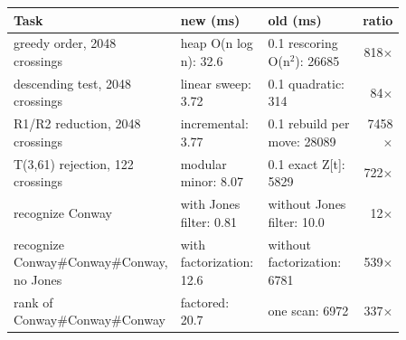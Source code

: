 \begin{tabular}{@{}p{0.36\linewidth}p{0.23\linewidth}p{0.27\linewidth}r@{}}
\toprule
Task & new (ms) & old (ms) & ratio \\
\midrule
greedy order, 2048 crossings & heap O(n log n): 32.6 & 0.1 rescoring O(n$^2$): 26685 & 818$\times$ \\
descending test, 2048 crossings & linear sweep: 3.72 & 0.1 quadratic: 314 & 84$\times$ \\
R1/R2 reduction, 2048 crossings & incremental: 3.77 & 0.1 rebuild per move: 28089 & 7458$\times$ \\
T(3,61) rejection, 122 crossings & modular minor: 8.07 & 0.1 exact Z[t]: 5829 & 722$\times$ \\
recognize Conway & with Jones filter: 0.81 & without Jones filter: 10.0 & 12$\times$ \\
recognize Conway\#Conway\#Conway, no Jones & with factorization: 12.6 & without factorization: 6781 & 539$\times$ \\
rank of Conway\#Conway\#Conway & factored: 20.7 & one scan: 6972 & 337$\times$ \\
\bottomrule
\end{tabular}
